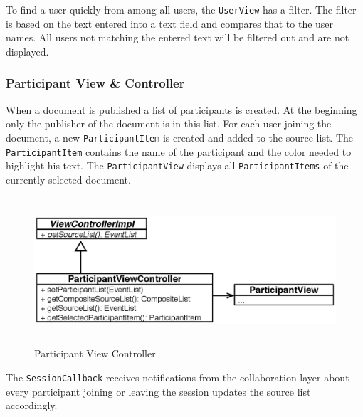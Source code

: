 To find a user quickly from among all users, the \texttt{User\-View} has a filter. The filter is based on the text entered into a text field and compares that to the user names. All users not matching the entered text will be filtered out and are not displayed.


\subsubsection{Participant View \& Controller}
When a document is published a list of participants is created. At the beginning only the publisher of the document is in this list. For each user joining the document, a new \texttt{Participant\-Item} is created and added to the source list. The \texttt{Participant\-Item} contains the name of the participant and the color needed to highlight his text. The \texttt{Participant\-View} displays all \texttt{Participant\-Items} of the currently selected document.

\begin{figure}[H]
\begin{center}
  \includegraphics[height=2.15in, width=5.62in]{../images/finalreport/application_participantview.eps}
\caption{Participant View Controller}
\label{application_participantview}
\end{center}
\end{figure}

The \texttt{Session\-Callback} receives notifications from the collaboration layer about every participant joining or leaving the session updates the source list accordingly.

